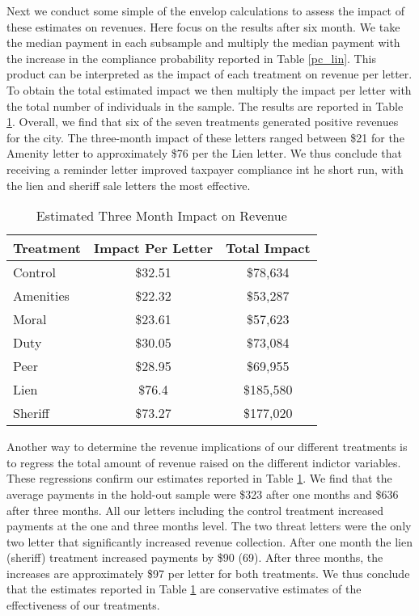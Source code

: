 \documentclass[12pt]{article}
\begin{document}
Next we conduct some simple of the envelop calculations to assess the
impact of these estimates on revenues. Here focus on the results after
six month. We take the median payment in each subsample and multiply
the median payment with the increase in the compliance probability
reported in Table \ref{pc_lin}. This product can be interpreted as the
impact of each treatment on revenue per letter. To obtain the total
estimated impact we then multiply the impact per letter with the total
number of individuals in the sample. The results are reported in Table
\ref{sh_rev}.  Overall, we find that six of the seven treatments
generated positive revenues for the city.  The three-month impact of
these letters ranged between \$21 for the Amenity letter to
approximately \$76 per the Lien letter. We thus conclude that
receiving a reminder letter improved taxpayer compliance int he short
run, with the lien and sheriff sale letters the most effective.

\begin{table}[htbp]
\caption{Estimated Three Month Impact on Revenue}\label{sh_rev}
\bigskip
\centering
\begin{tabular}{lcc}
  \hline
Treatment & Impact Per Letter & Total Impact \\ 
  \hline
Control & \$32.51 & \$78,634 \\ 
  Amenities & \$22.32 & \$53,287 \\ 
  Moral & \$23.61 & \$57,623 \\ 
  Duty & \$30.05 & \$73,084 \\ 
  Peer & \$28.95 & \$69,955 \\ 
  Lien & \$76.4 & \$185,580 \\ 
  Sheriff & \$73.27 & \$177,020 \\ 
   \hline
\end{tabular}
\end{table}

Another way to determine the revenue implications of our different
treatments is to regress the total amount of revenue raised on the
different indictor variables.  These regressions confirm our estimates
reported in Table \ref{sh_rev}. We find that the average payments in
the hold-out sample were \$323 after one months and \$636 after three
months. All our letters including the control treatment increased
payments at the one and three months level. The two threat letters
were the only two letter that significantly increased revenue
collection. After one month the lien (sheriff) treatment increased
payments by \$90 (69). After three months, the increases are
approximately \$97 per letter for both treatments. We thus conclude
that the estimates reported in Table \ref{sh_rev} are conservative
estimates of the effectiveness of our treatments.
\end{document}
